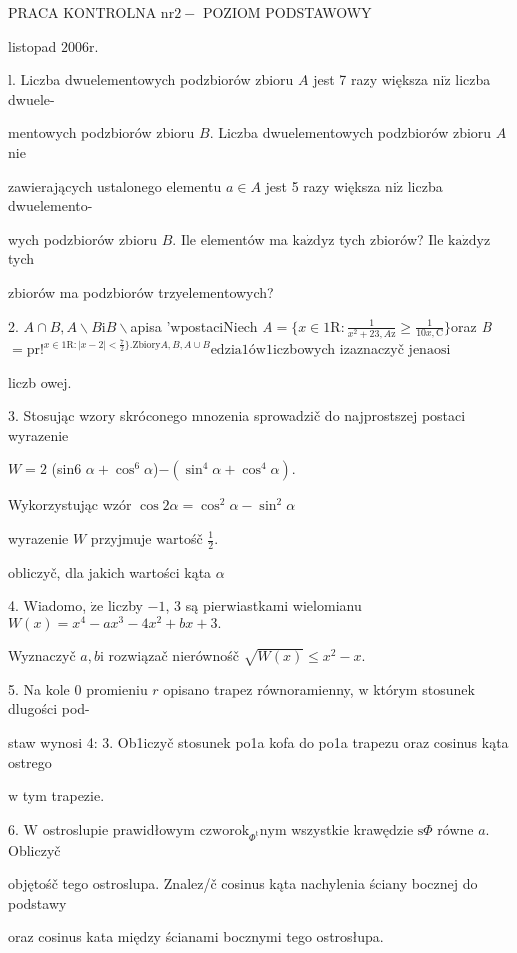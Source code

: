\documentclass[a4paper,12pt]{article}
\begin{document}
PRACA KONTROLNA $\mathrm{n}\mathrm{r}2-$ POZIOM PODSTAWOWY

listopad $2006\mathrm{r}.$

l. Liczba dwuelementowych podzbiorów zbioru $A$ jest 7 razy większa $\mathrm{n}\mathrm{i}\dot{\mathrm{z}}$ liczba dwuele-

mentowych podzbiorów zbioru $B$. Liczba dwuelementowych podzbiorów zbioru $A$ nie

zawierających ustalonego elementu $a\in A$ jest 5 razy większa $\mathrm{n}\mathrm{i}\dot{\mathrm{z}}$ liczba dwuelemento-

wych podzbiorów zbioru $B$. Ile elementów ma $\mathrm{k}\mathrm{a}\dot{\mathrm{z}}\mathrm{d}\mathrm{y}\mathrm{z}$ tych zbiorów? Ile $\mathrm{k}\mathrm{a}\dot{\mathrm{z}}\mathrm{d}\mathrm{y}\mathrm{z}$ tych

zbiorów ma podzbiorów trzyelementowych?

2. $A\cap B, A\backslash B\mathrm{i}B\backslash $apisa '$\mathrm{w}\mathrm{p}$ostaciNiech {\it A}$=\displaystyle \{x\in 1\mathrm{R}:\frac{1}{x^{2}+23,A\mathrm{z}}\geq\frac{1}{10x,\mathrm{C}}\}$oraz {\it B}$=\mathrm{p}\mathrm{r}!^{x\in 1\mathrm{R}:|x-2|<\frac{7}{2}\}.\mathrm{Z}\mathrm{b}\mathrm{i}\mathrm{o}\mathrm{r}\mathrm{y}A,B,A\cup B}\mathrm{e}\mathrm{d}\mathrm{z}\mathrm{i}\mathrm{a}1\text{ó} \mathrm{w}1$iczbowych izaznaczyč j$\mathrm{e}\mathrm{n}\mathrm{a}\mathrm{o}\mathrm{s}\mathrm{i}$

liczb owej.

3. Stosując wzory skróconego mnozenia sprowadzič do najprostszej postaci wyrazenie

$W=2$ (sin6 $\alpha+\cos^{6}\alpha$)$-(\sin^{4}\alpha+\cos^{4}\alpha).$

Wykorzystując wzór $\cos 2\alpha = \cos^{2}\alpha-\sin^{2}\alpha$

wyrazenie $W$ przyjmuje wartośč $\displaystyle \frac{1}{2}.$

obliczyč, dla jakich wartości kąta $\alpha$

4. Wiadomo, $\dot{\mathrm{z}}\mathrm{e}$ liczby $-1$, 3 są pierwiastkami wielomianu $W(x)=x^{4}-ax^{3}-4x^{2}+bx+3.$

Wyznaczyč $a, b\mathrm{i}$ rozwiązač nierównośč $\sqrt{W(x)}\leq x^{2}-x.$

5. Na kole $0$ promieniu $r$ opisano trapez równoramienny, $\mathrm{w}$ którym stosunek dlugości pod-

staw wynosi 4: 3. Ob1iczyč stosunek po1a kofa do po1a trapezu oraz cosinus kąta ostrego

$\mathrm{w}$ tym trapezie.

6. $\mathrm{W}$ ostroslupie prawidłowym $\mathrm{c}\mathrm{z}\mathrm{w}\mathrm{o}\mathrm{r}\mathrm{o}\mathrm{k}_{\Phi^{\mathrm{t}}}\mathrm{n}\mathrm{y}\mathrm{m}$ wszystkie krawędzie $\mathrm{s}\Phi$ równe $a$. Obliczyč

objętośč tego ostroslupa. Znalez/č cosinus kąta nachylenia ściany bocznej do podstawy

oraz cosinus kata między ścianami bocznymi tego ostrosłupa.
\end{document}
